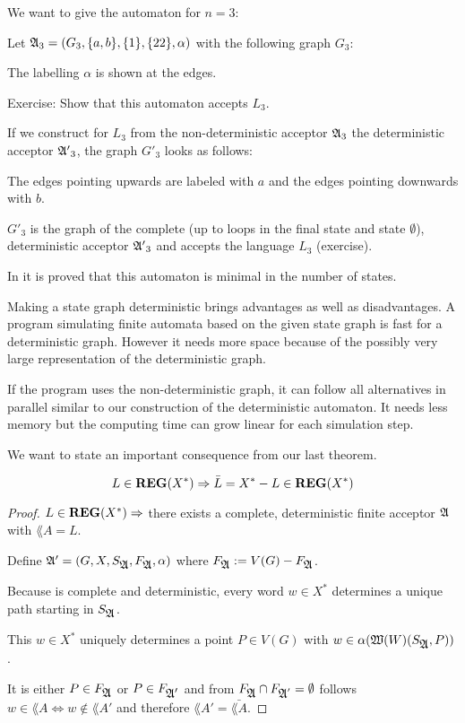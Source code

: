 We want to give the automaton for $n = 3$:

Let $\mbox{$\mathfrak{A}$}_3 = (G_3, \mbox{$\{a,b\}$}, \mbox{$\{1\}$}, \mbox{$\{22\}$}, \alpha)$ with the
following graph $G_3$:

\begin{center}

\end{center}

The labelling $\alpha$ is shown at the edges.

Exercise: Show that this automaton accepts $L_3$.

If we construct for $L_3$ from the non-deterministic acceptor $\mbox{$\mathfrak{A}$}_3$
the deterministic acceptor $\mbox{$\mathfrak{A'}$}_3$, the graph $G'_3$ looks as follows:

\missingfigure

The edges pointing upwards are labeled with $a$ and the edges pointing downwards
with $b$.

$G'_3$ is the graph of the complete (up to loops in the final state and state
$\emptyset$), deterministic acceptor $\mbox{$\mathfrak{A'}$}_3$ and accepts the language $L_3$
(exercise).

In \cite{Commentz} it is proved that this automaton is minimal in the number of
states.

Making a state graph deterministic brings advantages as well as disadvantages. A
program simulating finite automata based on the given state graph is fast for
a deterministic graph. However it needs more space because of the possibly very
large representation of the deterministic graph.

If the program uses the non-deterministic graph, it can follow all alternatives
in parallel similar to our construction of the deterministic automaton. It needs
less memory but the computing time can grow linear for each simulation step.

We want to state an important consequence from our last theorem.

\begin{theorem}
\[ L \in \mbox{{\bf REG}}(X^*) \Rightarrow \bar{L} = X^* - L \in \mbox{{\bf REG}}(X^*) \]
\end{theorem}

\begin{proof}
$L \in \mbox{{\bf REG}}(X^*) \Rightarrow $ there exists a complete, deterministic
finite acceptor $\mbox{$\mathfrak{A}$}$ with $\lang{A} = L$.

Define $\mbox{$\mathfrak{A'}$} = (G, X, S_{\mbox{$\mathfrak{A}$}}, F_{\mbox{$\mathfrak{A}$}}, \alpha)$ where $F_{\mbox{$\mathfrak{A}$}} :=
V(G) - F_{\mbox{$\mathfrak{A}$}}$.

Because  is complete and deterministic, every word $w \in X^*$ determines
a unique path starting in $S_{\mbox{$\mathfrak{A}$}}$.

This $w \in X^*$ uniquely determines a point $P \in V(G)$ with $w \in
\alpha(\mbox{$\mathfrak{W}({W})$}(S_{\mbox{$\mathfrak{A}$}}, P))$.

It is either $P \in F_{\mbox{$\mathfrak{A}$}}$ or $P \in F_{\mbox{$\mathfrak{A'}$}}$ and from $F_{\mbox{$\mathfrak{A}$}}
\cap F_{\mbox{$\mathfrak{A}$}'} = \emptyset$ follows $w \in \lang{A} \Leftrightarrow w
\notin \lang{A'}$ and therefore $\lang{A'} = \bar{\lang{A}}$.
\end{proof}

